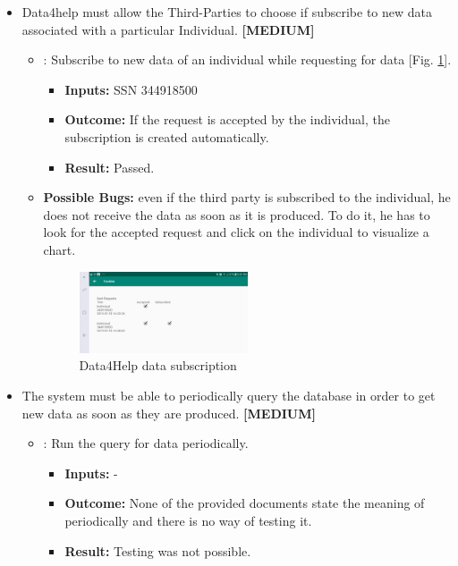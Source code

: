 \documentclass[a4paper, hidelinks, 12pt]{report}
\newcommand\requirement[1]{\item[{[REQ-#1]}] }
\newcommand\test[1]{\item[{[TEST-#1]}] }
\begin{document}
\begin{itemize}
	\requirement{12} Data4help must allow the Third-Parties to choose if subscribe to new data associated with a particular Individual. \textbf{[MEDIUM]}
			
				\begin{itemize}
		\test{11}: Subscribe to new data of an individual while requesting for data [Fig. \ref{fig:data_subscription}].
			\begin{itemize}
			\item \textbf{Inputs: } SSN 344918500			
			\item \textbf{Outcome: } If the request is accepted by the individual, the subscription is created automatically.
			\item \textbf{Result: } Passed. 
			\end{itemize}
			\item{\textbf{Possible Bugs:}} even if the third party is subscribed to the individual, he does not receive the data as soon as it is produced. To do it, he has to look for the accepted request and click on the individual to visualize a chart.
			
		\begin{figure}[H]
					\centering
				\includegraphics[width=0.5\textwidth]{images/data_subscription.jpeg}
					\caption[Data4Help data subscription]{Data4Help data subscription}
				\label{fig:data_subscription}
			\end{figure}		
		
	\end{itemize}
	
	\requirement{13} The system must be able to periodically query the database in order to get new data as soon as they are produced. \textbf{[MEDIUM]}	
			
				\begin{itemize}
		\test{12}: Run the query for data periodically.
			\begin{itemize}
			\item \textbf{Inputs: } -			
			\item \textbf{Outcome: } None of the provided documents state the meaning of periodically and there is no way of testing it.

			\item \textbf{Result: } Testing was not possible. 
			\end{itemize}
			

\end{itemize}
\end{itemize}
\end{document}
